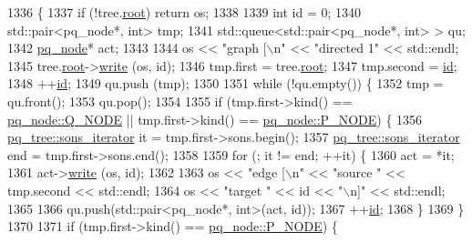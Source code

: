 \begin{DoxyCode}
1336 \{
1337     \textcolor{keywordflow}{if} (!tree.\mbox{\hyperlink{classpq__tree_ad8e4e2235fe68fb99769cec54e1760ba}{root}}) \textcolor{keywordflow}{return} os;
1338     
1339     \textcolor{keywordtype}{int} \textcolor{keywordtype}{id} = 0;
1340     std::pair<pq\_node*, int> tmp;
1341     std::queue<std::pair<pq\_node*, int> > qu;
1342     \mbox{\hyperlink{classpq__node}{pq\_node}}* act;
1343     
1344     os << \textcolor{stringliteral}{"graph [\(\backslash\)n"} << \textcolor{stringliteral}{"directed 1"} << std::endl;
1345     tree.\mbox{\hyperlink{classpq__tree_ad8e4e2235fe68fb99769cec54e1760ba}{root}}->\mbox{\hyperlink{classpq__node_aab7bddb053b6b25b90be00cba7de97f9}{write}} (os, \textcolor{keywordtype}{id});
1346     tmp.first = tree.\mbox{\hyperlink{classpq__tree_ad8e4e2235fe68fb99769cec54e1760ba}{root}};
1347     tmp.second = \mbox{\hyperlink{classpq__node_ad0034c1f93c3c77edb6d3a03f25aba06}{id}};
1348     ++\mbox{\hyperlink{classpq__node_ad0034c1f93c3c77edb6d3a03f25aba06}{id}};
1349     qu.push (tmp);
1350     
1351     \textcolor{keywordflow}{while} (!qu.empty()) \{
1352     tmp = qu.front();
1353     qu.pop();
1354     
1355     \textcolor{keywordflow}{if} (tmp.first->kind() == \mbox{\hyperlink{classpq__node_a96827bdca8bf81d20213405dd27f8fa6ae682b144f87217774df399363d0ef410}{pq\_node::Q\_NODE}} || tmp.first->kind() == 
      \mbox{\hyperlink{classpq__node_a96827bdca8bf81d20213405dd27f8fa6a0ea3d0eae8dd06c7039082054828ce77}{pq\_node::P\_NODE}}) \{
1356             \mbox{\hyperlink{structsymlist__iterator}{pq\_tree::sons\_iterator}} it = tmp.first->sons.begin();
1357             \mbox{\hyperlink{structsymlist__iterator}{pq\_tree::sons\_iterator}} end = tmp.first->sons.end();
1358         
1359         \textcolor{keywordflow}{for} (; it != end; ++it) \{
1360         act = *it;
1361         act->\mbox{\hyperlink{classpq__node_aab7bddb053b6b25b90be00cba7de97f9}{write}} (os, \textcolor{keywordtype}{id});
1362         
1363         os << \textcolor{stringliteral}{"edge [\(\backslash\)n"} << \textcolor{stringliteral}{"source "} << tmp.second << std::endl;
1364         os << \textcolor{stringliteral}{"target "} << \textcolor{keywordtype}{id} << \textcolor{stringliteral}{"\(\backslash\)n]"} << std::endl;
1365         
1366         qu.push(std::pair<pq\_node*, int>(act, \textcolor{keywordtype}{id}));
1367         ++\mbox{\hyperlink{classpq__node_ad0034c1f93c3c77edb6d3a03f25aba06}{id}};
1368         \}
1369         \}
1370 
1371         \textcolor{keywordflow}{if} (tmp.first->kind() == \mbox{\hyperlink{classpq__node_a96827bdca8bf81d20213405dd27f8fa6a0ea3d0eae8dd06c7039082054828ce77}{pq\_node::P\_NODE}}) \{

\end{DoxyCode}
